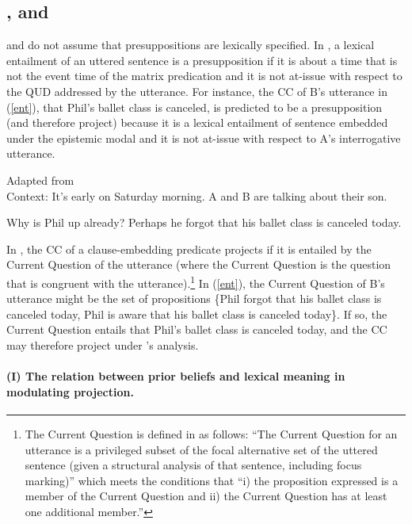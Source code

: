 \documentclass[11pt,fleqn]{article}
\newcommand{\6}{\mbox{$[\hspace*{-.6mm}[$}}
\newcommand{\9}{\mbox{$]\hspace*{-.6mm}]$}}
\newcommand{\citepos}[1]{\citeauthor{#1}'s \citeyear{#1}}
\begin{document}
\subsection{\citealt{abrusan2011,abrusan2016}, and \citealt{best-question}}\label{s42}

\citealt{abrusan2011,abrusan2016} and \citealt{best-question} do not assume that presuppositions are lexically specified. In \citealt{abrusan2011,abrusan2016}, a lexical entailment of an uttered sentence is a presupposition if it is about a time that is not the event time of the matrix predication and it is not at-issue with respect to the QUD addressed by the utterance. For instance, the CC of B's utterance in (\ref{ent}), that Phil's ballet class is canceled, is predicted to be a presupposition (and therefore project) because it is a lexical entailment of sentence embedded under the epistemic modal and it is not at-issue with respect to A's interrogative utterance. 

\begin{exe}
\ex \label{ent} Adapted from \citealt[188]{best-question} \\ Context: It's early on Saturday morning. A and B are talking about their son. 
\begin{xlist}
 Why is Phil up already?
 Perhaps he forgot that his ballet class is canceled today. 
\end{xlist}
\end{exe}

In \citealt{best-question}, the CC of a clause-embedding predicate projects if it is entailed by the Current Question of the utterance (where the Current Question is the question that is congruent with the utterance).\footnote{The Current Question is defined in \citealt[194]{best-question} as follows: ``The Current Question for an utterance is a privileged subset of the focal alternative set of the uttered sentence (given a structural analysis of that sentence, including focus marking)'' which meets the conditions that ``i) the proposition expressed is a member of the Current Question and ii) the Current Question has at least one additional member.''} In (\ref{ent}), the Current Question of B's utterance might be the set of propositions \{Phil forgot that his ballet class is canceled today, Phil is aware that his ballet class is canceled today\}. If so, the Current Question entails that Phil's ballet class is canceled today, and the CC may therefore project under \citepos{best-question} analysis.


\paragraph{(I) The relation between prior beliefs and lexical meaning in modulating projection.}
\end{document}
